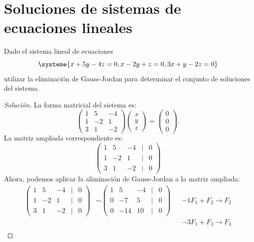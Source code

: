 \documentclass[a4,11pt]{aleph-notas}
\begin{document}
\encabezado

\section{Soluciones de sistemas de ecuaciones lineales}


\begin{ejer}
    Dado el sistema lineal de ecuaciones 
    \[
    \systeme{x+5y-4z=0, x-2y+z=0, 3x+y-2z=0}
    \]
    utilizar la eliminación de Gauss-Jordan para determinar el conjunto de soluciones del sistema.
\end{ejer}

\begin{proof}[Solución]\hspace{0pt}
    La forma matricial del sistema es:
    \[
    \begin{pmatrix}
    1&5&-4\\1&-2&1\\3&1&-2
    \end{pmatrix}
    \begin{pmatrix}
    x \\ y\\ z
    \end{pmatrix}
    =
    \begin{pmatrix}
    0 \\ 0\\ 0
    \end{pmatrix}.
    \]
    La matriz ampliada correspondiente es:
    \[
    \begin{pmatrix}
    1&5&-4&|&0\\
    1&-2&1&|&0\\
    3&1&-2&|&0
    \end{pmatrix}
    \]
    Ahora, podemos aplicar la aliminación de Gauss-Jordan a la matriz ampliada:
    \begin{align*}
      \begin{pmatrix}
        1&5&-4&|&0\\
        1&-2&1&|&0\\
        3&1&-2&|&0
      \end{pmatrix}
      & \sim 
      \begin{pmatrix}
        1&5&-4&|&0\\
        0&-7&5&|&0\\
        0&-14&10&|&0
      \end{pmatrix}
      && -1F_1+F_2\to F_2\\
      &&&-3F_1+F_3\to F_3\\

\end{align*}
\end{proof}
\end{document}
